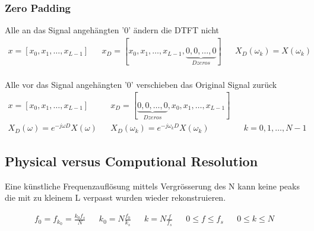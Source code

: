 \subsubsection{Zero Padding}
Alle an das Signal angehängten '0' ändern die DTFT nicht 
\begin{align*}
x= [x_0,x_1,\ldots,x_{L-1}] && x_D=[x_0,x_1,\ldots,x_{L-1},\underbrace{0,0,\ldots,0}_{D zeros}] && X_D(\omega_k)=X(\omega_k)\\
\end{align*}

Alle vor das Signal angehängten '0' verschieben das Original Signal zurück
\begin{align*}
x= [x_0,x_1,\ldots,x_{L-1}] && x_D=[\underbrace{0,0,\ldots,0}_{D zeros},x_0,x_1,\ldots,x_{L-1}] \\
X_D(\omega)=e^{-j\omega D}X(\omega) && X_D(\omega_k)=e^{-j\omega_k D}X(\omega_k) && k=0,1,\ldots,N-1
\end{align*}

\subsection{Physical versus Computional Resolution}
Eine künstliche Frequenzauflösung mittels Vergrösserung des N kann keine peaks die mit zu kleinem L verpasst wurden wieder rekonstruieren. 

\begin{align*}
f_0 = f_{k_0}=\frac{k_0f_s}{N} && k_0=N\frac{f_0}{k_s} && k=N\frac{f}{f_s} && 0 \leq f \leq f_s && 0 \leq k \leq N
\end{align*}

